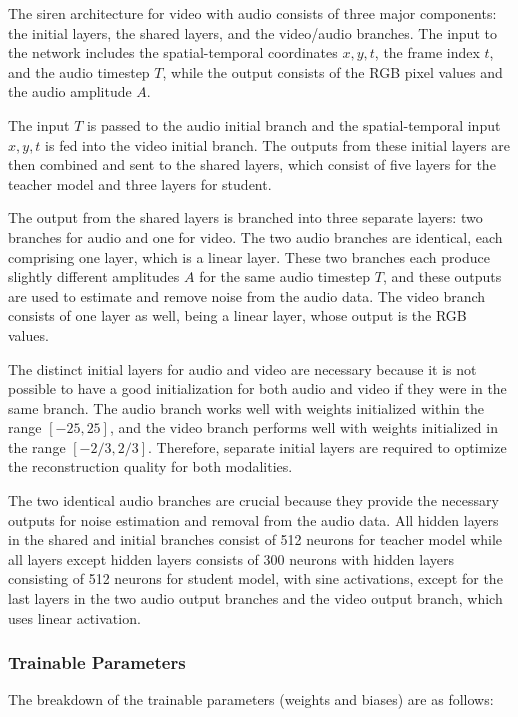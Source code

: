 The \gls{siren} architecture for video with audio consists of three major components: the initial layers, the shared layers, and the video/audio branches. The input to the network includes the spatial-temporal coordinates \(x, y, t\), the frame index \(t\), and the audio timestep \(T\), while the output consists of the RGB pixel values and the audio amplitude \(A\).

The input \(T\) is passed to the audio initial branch and the  spatial-temporal input \(x, y, t\) is fed into the video initial branch. The outputs from these initial layers are then combined and sent to the shared layers, which consist of five layers for the teacher model and three layers for student.

The output from the shared layers is branched into three separate layers: two branches for audio and one for video. The two audio branches are identical, each comprising one layer, which  is a linear layer. These two branches each produce slightly different amplitudes \(A\) for the same audio timestep \(T\), and these outputs are used to estimate and remove noise from the audio data. The video branch consists of one layer as well, being a linear layer, whose output is the RGB values.

The distinct initial layers for audio and video are necessary because it is not possible to have a good initialization for both audio and video if they were in the same branch. The audio branch works well with weights initialized within the range \([-25, 25]\), and the video branch performs well with weights initialized in the range \([-2/3, 2/3]\). Therefore, separate initial layers are required to optimize the reconstruction quality for both modalities.

The two identical audio branches are crucial because they provide the necessary outputs for noise estimation and removal from the audio data. All hidden layers in the shared and initial branches consist of 512 neurons for teacher model while all layers except hidden layers consists of 300 neurons with hidden layers consisting of 512 neurons for student model, with sine activations, except for the last layers in the two audio output branches and the video output branch, which uses linear activation.

\subsubsection{Trainable Parameters}
The breakdown of the trainable parameters (weights and biases) are as follows:

